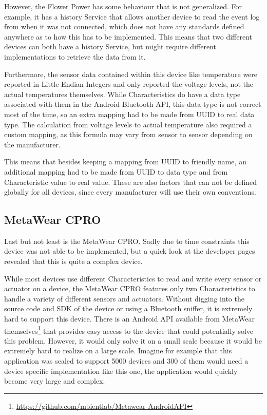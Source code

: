\documentclass[pdftex,a4paper,12pt,twoside]{report}
\begin{document}
However, the Flower Power has some behaviour that is not generalized. For example, it has a history Service that allows another device to read the event log from when it was not connected, which does not have any standards defined anywhere as to how this has to be implemented. This means that two different devices can both have a history Service, but might require different implementations to retrieve the data from it.

Furthermore, the sensor data contained within this device like temperature were reported in Little Endian Integers and only reported the voltage levels, not the actual temperatures themselves. While Characteristics do have a data type associated with them in the Android Bluetooth API, this data type is not correct most of the time, so an extra mapping had to be made from UUID to real data type. The calculation from voltage levels to actual temperature also required a custom mapping, as this formula may vary from sensor to sensor depending on the manufacturer.

This means that besides keeping a mapping from UUID to friendly name, an additional mapping had to be made from UUID to data type and from Characteristic value to real value. These are also factors that can not be defined globally for all devices, since every manufacturer will use their own conventions.

\subsection{MetaWear CPRO}
\label{subsec:achievementsmetawear}
Last but not least is the MetaWear CPRO. Sadly due to time constraints this device was not able to be implemented, but a quick look at the developer pages revealed that this is quite a complex device.

While most devices use different Characteristics to read and write every sensor or actuator on a device, the MetaWear CPRO features only two Characteristics to handle a variety of different sensors and actuators. Without digging into the source code and SDK of the device or using a Bluetooth sniffer, it is extremely hard to support this device. There is an Android API available from MetaWear themselves\footnote{\url{https://github.com/mbientlab/Metawear-AndroidAPI}} that provides easy access to the device that could potentially solve this problem. However, it would only solve it on a small scale because it would be extremely hard to realize on a large scale. Imagine for example that this application was scaled to support 5000 devices and 300 of them would need a device specific implementation like this one, the application would quickly become very large and complex.
\end{document}
